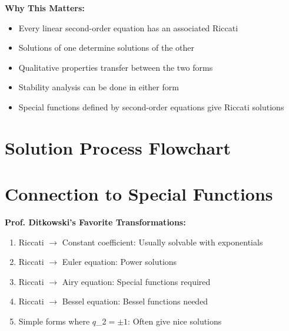 \documentclass[12pt]{article}
\begin{document}
\begin{insight}
\textbf{Why This Matters:}
\begin{itemize}
    \item Every linear second-order equation has an associated Riccati
    \item Solutions of one determine solutions of the other
    \item Qualitative properties transfer between the two forms
    \item Stability analysis can be done in either form
    \item Special functions defined by second-order equations give Riccati solutions
\end{itemize}
\end{insight}

\section{Solution Process Flowchart}

\begin{center}
\end{center}

\section{Connection to Special Functions}

\begin{examtip}
\textbf{Prof. Ditkowski's Favorite Transformations:}
\begin{enumerate}
    \item Riccati $\to$ Constant coefficient: Usually solvable with exponentials
    \item Riccati $\to$ Euler equation: Power solutions
    \item Riccati $\to$ Airy equation: Special functions required
    \item Riccati $\to$ Bessel equation: Bessel functions needed
    \item Simple forms where $q$_{2}$ = \pm 1$: Often give nice solutions
\end{enumerate}
\end{examtip}
\end{document}
